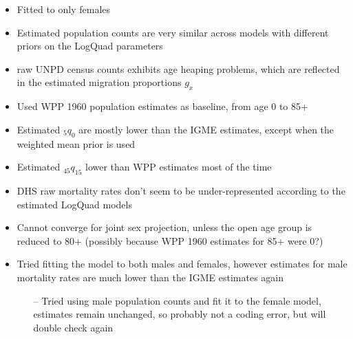 \documentclass[12pt,a4paper]{article}
\date{\vspace{-5ex}}
\begin{document}
\begin{itemize}
\item Fitted to only females
\item Estimated population counts are very similar across models with different priors on the LogQuad parameters
\item raw UNPD census counts exhibits age heaping problems, which are reflected in the estimated migration proportions $g_x$
\item Used WPP 1960 population estimates as baseline, from age 0 to 85+
\item Estimated $_5q_0$ are mostly lower than the IGME estimates, except when the weighted mean prior is used
\item Estimated $_{45}q_{15}$ lower than WPP estimates most of the time
\item DHS raw mortality rates don't seem to be under-represented according to the estimated LogQuad models
\item Cannot converge for joint sex projection, unless the open age group is reduced to 80+ (possibly because WPP 1960 estimates for 85+ were 0?)
\item Tried fitting the model to both males and females, however estimates for male mortality rates are much lower than the IGME estimates again
\begin{itemize}
\item[--] Tried using male population counts and fit it to the female model, estimates remain unchanged, so probably not a coding error, but will double check again
\end{itemize}
\end{itemize}
\end{document}
